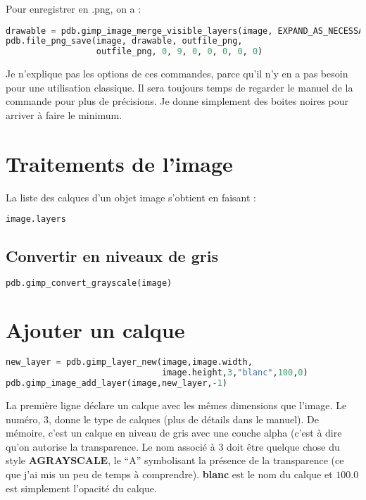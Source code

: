 \documentclass[a4paper,twoside]{article}
\begin{document}
Pour enregistrer en .png, on a : 
\begin{lstlisting}[language=Python]
drawable = pdb.gimp_image_merge_visible_layers(image, EXPAND_AS_NECESSARY)
pdb.file_png_save(image, drawable, outfile_png, 
                  outfile_png, 0, 9, 0, 0, 0, 0, 0)
\end{lstlisting}

\begin{remarque}
Je n'explique pas les options de ces commandes, parce qu'il n'y en a pas besoin pour une utilisation classique. Il sera toujours temps de regarder le manuel de la commande pour plus de précisions. Je donne simplement des boites noires pour arriver à faire le minimum.
\end{remarque}

\section{Traitements de l'image}
La liste des calques d'un objet image s'obtient en faisant : 
\begin{lstlisting}[language=Python]
image.layers
\end{lstlisting}

\subsection{Convertir en niveaux de gris}
\begin{lstlisting}[language=Python]
pdb.gimp_convert_grayscale(image)
\end{lstlisting}

\section{Ajouter un calque}
\begin{lstlisting}[language=Python]
new_layer = pdb.gimp_layer_new(image,image.width,
                               image.height,3,"blanc",100,0)
pdb.gimp_image_add_layer(image,new_layer,-1)
\end{lstlisting}

La première ligne déclare un calque avec les mêmes dimensions que l'image. Le numéro, $3$, donne le type de calques (plus de détails dans le manuel). De mémoire, c'est un calque en niveau de gris avec une couche alpha (c'est à dire qu'on autorise la transparence. Le nom associé à $3$ doit être quelque chose du style \textbf{AGRAYSCALE}, le ``A'' symbolisant la présence de la transparence (ce que j'ai mis un peu de temps à comprendre). \textbf{blanc} est le nom du calque et $100.0$ est simplement l'opacité du calque.
\end{document}
